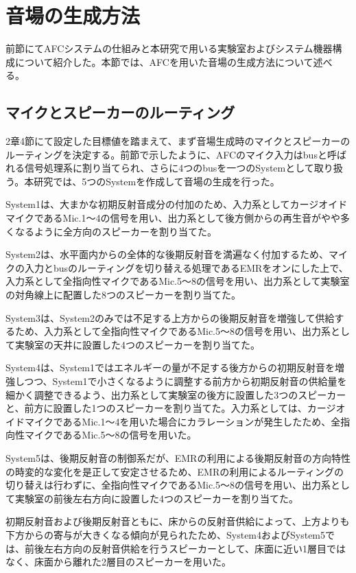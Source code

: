 \documentclass[11pt,a4j]{jreport}
\begin{document}
\section{音場の生成方法}
前節にてAFCシステムの仕組みと本研究で用いる実験室およびシステム機器構成について紹介した。本節では、AFCを用いた音場の生成方法について述べる。

\subsection*{マイクとスピーカーのルーティング}
2章4節にて設定した目標値を踏まえて、まず音場生成時のマイクとスピーカーのルーティングを決定する。前節で示したように、AFCのマイク入力はbusと呼ばれる信号処理系に割り当てられ、さらに4つのbusを一つのSystemとして取り扱う。本研究では、5つのSystemを作成して音場の生成を行った。

System1は、大まかな初期反射音成分の付加のため、入力系としてカージオイドマイクであるMic.1〜4の信号を用い、出力系として後方側からの再生音がやや多くなるように全方向のスピーカーを割り当てた。

System2は、水平面内からの全体的な後期反射音を満遍なく付加するため、マイクの入力とbusのルーティングを切り替える処理であるEMRをオンにした上で、入力系として全指向性マイクであるMic.5〜8の信号を用い、出力系として実験室の対角線上に配置した8つのスピーカーを割り当てた。

System3は、System2のみでは不足する上方からの後期反射音を増強して供給するため、入力系として全指向性マイクであるMic.5〜8の信号を用い、出力系として実験室の天井に設置した4つのスピーカーを割り当てた。

System4は、System1ではエネルギーの量が不足する後方からの初期反射音を増強しつつ、System1で小さくなるように調整する前方から初期反射音の供給量を細かく調整できるよう、出力系として実験室の後方に設置した3つのスピーカーと、前方に設置した1つのスピーカーを割り当てた。入力系としては、カージオイドマイクであるMic.1〜4を用いた場合にカラレーションが発生したため、全指向性マイクであるMic.5〜8の信号を用いた。

System5は、後期反射音の制御系だが、EMRの利用による後期反射音の方向特性の時変的な変化を是正して安定させるため、EMRの利用によるルーティングの切り替えは行わずに、全指向性マイクであるMic.5〜8の信号を用い、出力系として実験室の前後左右方向に設置した4つのスピーカーを割り当てた。

初期反射音および後期反射音ともに、床からの反射音供給によって、上方よりも下方からの寄与が大きくなる傾向が見られたため、System4およびSystem5では、前後左右方向の反射音供給を行うスピーカーとして、床面に近い1層目ではなく、床面から離れた2層目のスピーカーを用いた。
\end{document}
